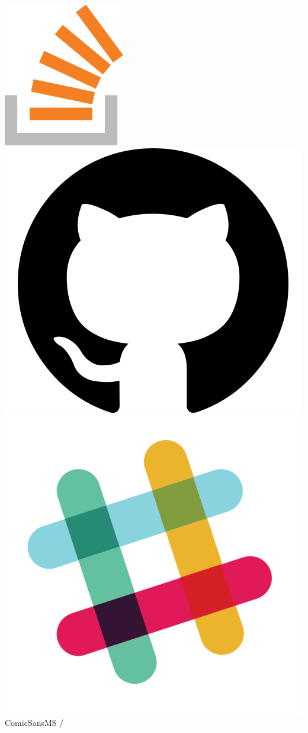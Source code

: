 \documentclass[aspectratio=169]{beamer}
\begin{document}
\begin{frame}
\href{https://stackoverflow.com/users/577603/comicsansms}{\includegraphics[height=.05\textheight]{resources/so-icon.png}}
  \href{https://github.com/ComicSansMS}{\includegraphics[height=.05\textheight]{resources/github-icon.png}}
  \includegraphics[height=.05\textheight]{resources/slack-icon.png} ComicSansMS /

\end{frame}
\end{document}
